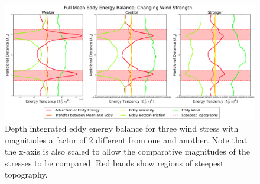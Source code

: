 \documentclass[12pt,a4paper]{report}
\begin{document}
 	\begin{figure}
 		\centering
 		\includegraphics[width=\linewidth]{energybal_1_4}
 		\caption{ Depth integrated eddy energy balance for three wind
 			stress with magnitudes a factor of 2 different from one and another.
 			Note that the x-axis is also scaled to allow the comparative magnitudes
 			of the stresses to be compared. Red bands show regions of steepest topography.}
 		\label{fig:energybalancewindstrength}
 	\end{figure} 
 	
\end{document}
